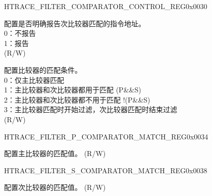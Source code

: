 \addtocounter{Regfloat}{-1}
\begin{register}{H}{TRACE\_FILTER\_COMPARATOR\_CONTROL\_REG}{0x0030}
\begin{regdesc}\begin{reglist}
\item [接上页...]

\label{fielddesc:TRACESNOTIFY}\item [TRACE\_S\_NOTIFY] 配置是否明确报告次比较器匹配的指令地址。\\
0：不报告\\
1：报告\\ (R/W)
\label{fielddesc:TRACEMATCHMODE}\item [TRACE\_MATCH\_MODE] 配置比较器的匹配条件。\\
0：仅主比较器匹配\\
1：主比较器和次比较器都用于匹配 (P\&\&S)\\
2：主比较器和次比较器都不用于匹配 !(P\&\&S)\\
3：主比较器匹配时开始过滤，次比较器匹配时结束过滤\\ (R/W)
\end{reglist}\end{regdesc}
\end{register}


\begin{register}{H}{TRACE\_FILTER\_P\_COMPARATOR\_MATCH\_REG}{0x0034}\label{regdesc:TRACEFILTERPCOMPARATORMATCHREG}
%
\regnewline%
\begin{regdesc}\begin{reglist}
\label{fielddesc:TRACEPMATCH}\item [TRACE\_P\_MATCH] 配置主比较器的匹配值。 (R/W)
\end{reglist}\end{regdesc}
\end{register}


\begin{register}{H}{TRACE\_FILTER\_S\_COMPARATOR\_MATCH\_REG}{0x0038}\label{regdesc:TRACEFILTERSCOMPARATORMATCHREG}
%
\regnewline%
\begin{regdesc}\begin{reglist}
\label{fielddesc:TRACESMATCH}\item [TRACE\_S\_MATCH] 配置次比较器的匹配值。 (R/W)
\end{reglist}\end{regdesc}
\end{register}


